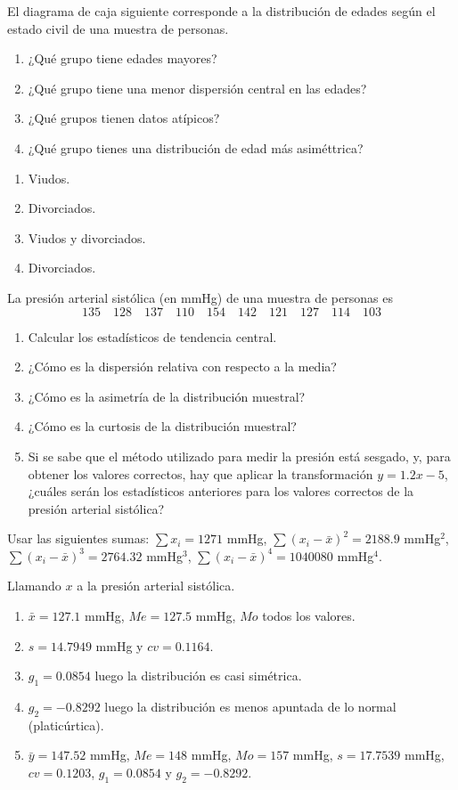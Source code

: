 {El diagrama de caja siguiente corresponde a la distribución de edades según el estado civil de una muestra de personas.
\begin{center}
\resizebox{0.6\textwidth}{!}{}
\end{center}

\begin{enumerate}
\item ¿Qué grupo tiene edades mayores?
\item ¿Qué grupo tiene una menor dispersión central en las edades?
\item ¿Qué grupos tienen datos atípicos?
\item ¿Qué grupo tienes una distribución de edad más asiméttrica?
\end{enumerate}
}
{
\begin{enumerate}
\item Viudos.
\item Divorciados.
\item Viudos y divorciados.
\item Divorciados. 
\end{enumerate}
}
{
}


{La presión arterial sistólica (en mmHg) de una muestra de personas es 
\[
135\quad 128\quad 137\quad 110\quad 154\quad 142\quad 121\quad 127\quad 114\quad 103
\]

\begin{enumerate}
\item Calcular los estadísticos de tendencia central.
\item ¿Cómo es la dispersión relativa con respecto a la media?
\item ¿Cómo es la asimetría de la distribución muestral?
\item ¿Cómo es la curtosis de la distribución muestral?
\item Si se sabe que el método utilizado para medir la presión está sesgado, y, para obtener los valores correctos, hay que aplicar la transformación $y=1.2x-5$, ¿cuáles serán los estadísticos anteriores para los valores correctos de la presión arterial sistólica?
\end{enumerate}


Usar las siguientes sumas: $\sum x_i= 1271$ mmHg, $\sum (x_i-\bar x)^2=2188.9$ mmHg$^2$, $\sum (x_i-\bar x)^3=2764.32$
mmHg$^3$, $\sum (x_i-\bar x)^4=1040080$ mmHg$^4$.
}
{
Llamando $x$ a la presión arterial sistólica.
\begin{enumerate}
\item $\bar{x}=127.1$ mmHg, $Me=127.5$ mmHg, $Mo$ todos los valores. 
\item $s=14.7949$ mmHg y $cv=0.1164$. 
\item $g_1=0.0854$ luego la distribución es casi simétrica.
\item $g_2= -0.8292$ luego la distribución es menos apuntada de lo normal (platicúrtica).
\item $\bar{y}=147.52$ mmHg, $Me=148$ mmHg, $Mo=157$ mmHg, $s=17.7539$ mmHg, $cv=0.1203$, $g_1=0.0854$ y $g_2= -0.8292$.
\end{enumerate}
}
{
}

